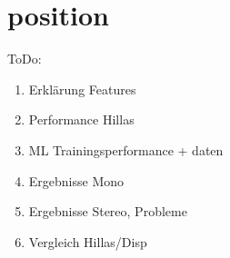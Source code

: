 \chapter{position}\label{position}

ToDo:
\begin{enumerate}[nosep]
    \item Erklärung Features
    \item Performance Hillas
    \item ML Trainingsperformance + daten
    \item Ergebnisse Mono
    \item Ergebnisse Stereo, Probleme
    \item Vergleich Hillas/Disp
\end{enumerate}
